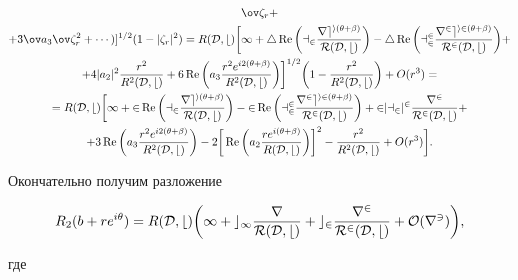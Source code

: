 \begin{pf}
\begin{multline*}
\ov\zeta_r+ \\ 


% 


+3\ov a_3\ov\zeta^2_r+\dotsb)]^{1/2}(1-|\zeta_r|^2)= 


R(\cal D,b)\bigg[1+4\re\bigg(a_2\frac{r e^{i(\theta+\beta)}} 


{R(\cal D,b)}\bigg)-4\re\bigg(a^2_2 


\frac{r^2e^{i2(\theta+\beta)}}{R^2(\cal D,b)}\bigg) + \\ 


% 


+4|a_2|^2\frac{r^2}{R^2(\cal D,b)}+6\re\bigg(a_3 


\frac{r^2 e^{i2(\theta+\beta)}}{R^2(\cal D,b)}\bigg)\bigg]^{1/2} 


\bigg(1-\frac{r^2}{R^2(\cal D,b)} \bigg)+O(r^3)= \\ 


% 


=R(\cal D,b)\bigg[1+2\re\bigg(a_2\frac{r e^{i(\theta+\beta)}}{R(\cal D,b)} 


\bigg)-2\re\bigg(a^2_2 


\frac{r^2e^{i2(\theta+\beta)}}{R^2(\cal D,b)}\bigg)+ 


2|a_2|^2\frac{r^2}{R^2(\cal D,b)} + \\ 


% 


+3\re\bigg(a_3\frac{r^2e^{i2(\theta+\beta)}}{R^2(\cal D,b)}\bigg) 


-2\bigg[\re\bigg(a_2\frac{r e^{i(\theta+\beta)} }{R(\cal D,b)}\bigg)


\bigg]^2-\frac{r^2}{R^2(\cal D,b)}+O(r^3)\bigg]. 


\end{multline*} 


Окончательно получим разложение 


\begin{equation} 


R_2(b+r e^{i\theta})=R(\cal D,b)\bigg(1+c_1 


\frac{r}{R(\cal D,b)}+c_2\frac{r^2}{R^2(\cal D,b)}+ 


O(r^3)\bigg), 


\end{equation} 


где 


\begin{equation} 


\begin{array}{c} 



\end{array}
\end{equation}
\end{pf}
